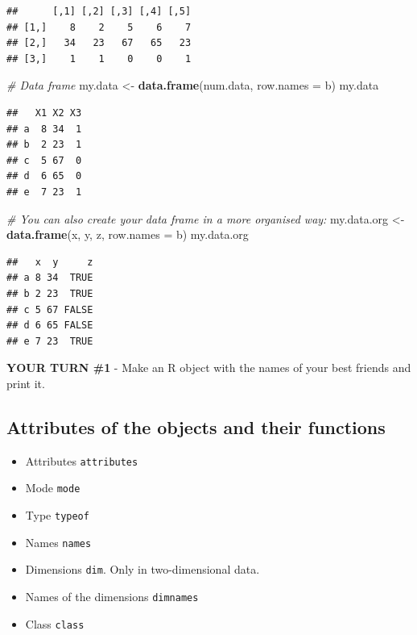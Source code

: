 \documentclass[
]{article}
\newenvironment{Shaded}{\begin{snugshade}}{\end{snugshade}}
\newcommand{\CommentTok}[1]{\textcolor[rgb]{0.56,0.35,0.01}{\textit{#1}}}
\newcommand{\DataTypeTok}[1]{\textcolor[rgb]{0.13,0.29,0.53}{#1}}
\newcommand{\KeywordTok}[1]{\textcolor[rgb]{0.13,0.29,0.53}{\textbf{#1}}}
\newcommand{\NormalTok}[1]{#1}
\newcommand{\StringTok}[1]{\textcolor[rgb]{0.31,0.60,0.02}{#1}}
\providecommand{\tightlist}{%
  \setlength{\itemsep}{0pt}\setlength{\parskip}{0pt}}
\begin{document}
\begin{verbatim}
##      [,1] [,2] [,3] [,4] [,5]
## [1,]    8    2    5    6    7
## [2,]   34   23   67   65   23
## [3,]    1    1    0    0    1
\end{verbatim}

\begin{Shaded}
\begin{Highlighting}[]
\CommentTok{# Data frame}
\NormalTok{my.data <-}\StringTok{ }\KeywordTok{data.frame}\NormalTok{(num.data, }\DataTypeTok{row.names =}\NormalTok{ b)}
\NormalTok{my.data}
\end{Highlighting}
\end{Shaded}

\begin{verbatim}
##   X1 X2 X3
## a  8 34  1
## b  2 23  1
## c  5 67  0
## d  6 65  0
## e  7 23  1
\end{verbatim}

\begin{Shaded}
\begin{Highlighting}[]
\CommentTok{# You can also create your data frame in a more organised way:}
\NormalTok{my.data.org <-}\StringTok{ }\KeywordTok{data.frame}\NormalTok{(x, y, z, }\DataTypeTok{row.names =}\NormalTok{ b)}
\NormalTok{my.data.org}
\end{Highlighting}
\end{Shaded}

\begin{verbatim}
##   x  y     z
## a 8 34  TRUE
## b 2 23  TRUE
## c 5 67 FALSE
## d 6 65 FALSE
## e 7 23  TRUE
\end{verbatim}

\textbf{YOUR TURN \#1} - Make an R object with the names of your best
friends and print it.

\hypertarget{attributes-of-the-objects-and-their-functions}{%
\subsection{Attributes of the objects and their
functions}\label{attributes-of-the-objects-and-their-functions}}

\begin{itemize}
\tightlist
\item
  Attributes \texttt{attributes}
\item
  Mode \texttt{mode}
\item
  Type \texttt{typeof}
\item
  Names \texttt{names}
\item
  Dimensions \texttt{dim}. Only in two-dimensional data.
\item
  Names of the dimensions \texttt{dimnames}
\item
  Class \texttt{class}
\end{itemize}
\end{document}
